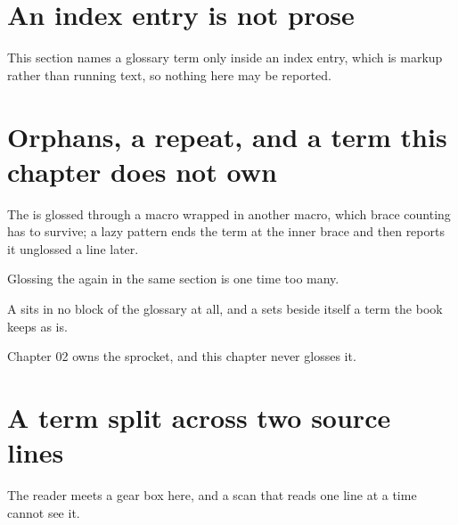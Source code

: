 
\section{An index entry is not prose}

This section names a glossary term only inside an index entry, which is markup
rather than running text, so nothing here may be reported.

%

\section{Orphans, a repeat, and a term this chapter does not own}

The  is glossed through a macro wrapped in
another macro, which brace counting has to survive; a lazy pattern ends the
term at the inner brace and then reports it unglossed a line later.

Glossing the  again in the same section is one time
too many.

A  sits in no block of the glossary at all, and a
 sets beside itself a term the book keeps as is.

Chapter 02 owns the sprocket, and this chapter never glosses it.

\section{A term split across two source lines}

The reader meets a gear
box here, and a scan that reads one line at a time cannot see it.
